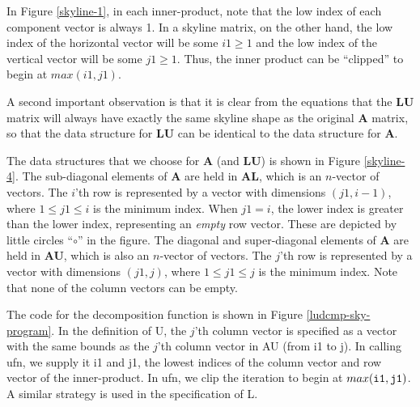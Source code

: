 In Figure \ref{skyline-1}, in each inner-product, note that the low
index of each component vector is always 1.  In a skyline matrix, on
the other hand, the low index of the horizontal vector will be some
$i1 \geq 1$ and the low index of the vertical vector will be some $j1
\geq 1$.  Thus, the inner product can be ``clipped'' to begin at $max(i1,j1)$.

A second important observation is that it is clear from the equations
that the {\bf LU} matrix will always have exactly the same skyline
shape as the original {\bf A} matrix, so that the data structure for
{\bf LU} can be identical to the data structure for {\bf A}.

The data structures that we choose for {\bf A} (and {\bf LU}) is shown in Figure
\ref{skyline-4}. The sub-diagonal elements of {\bf A} are held in {\bf AL}, which is an
$n$-vector of vectors.  The $i$'th row is represented by a vector with
dimensions $(j1,i-1)$, where $1 \leq j1 \leq i$ is the minimum index.
When $j1 = i$, the lower index is greater than the lower index,
representing an {\em empty\/} row vector.  These are depicted by
little circles ``$\circ$'' in the figure.  The diagonal and
super-diagonal elements of {\bf A} are held in {\bf AU}, which is also
an $n$-vector of vectors.  The $j$'th row is represented by a vector
with dimensions $(j1,j)$, where $1 \leq j1 \leq j$ is the minimum
index.  Note that none of the column vectors can be empty.

\begin{figure}[htbp]
\end{figure}

The code for the decomposition function is shown in Figure
\ref{ludcmp-sky-program}.  In the definition of {\cf U}, the $j$'th
column vector is specified as a vector with the same bounds as the
$j$'th column vector in {\cf AU} (from {\cf i1} to {\cf j}).  In
calling {\cf ufn}, we supply it {\cf i1} and {\cf j1}, the lowest
indices of the column vector and row vector of the inner-product.  In
{\cf ufn}, we clip the iteration to begin at {\cf $max({\tt i1},{\tt j1})$}.
A similar strategy is used in the specification of {\cf L}.

